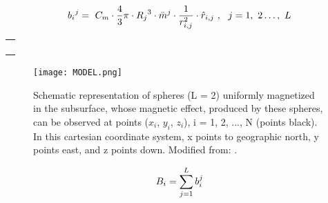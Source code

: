 
\begin{equation} \label{eq:sphere2}
\centering
{b_i}^j=\ C_m \cdot \frac{4}{3}\pi \cdot {R_j}^3 \cdot {\bar{m}}^j\cdot\frac{1}{r_{i,j}^2}\cdot{\hat{r}}_{i,j}\ ,\ \ j=1,\ 2\ldots,\ L
\end{equation}

\begin{tabular}{ l }
\noindent{Where: $C_m=\ \frac{\mu_0}{4\pi}=\ {10}^{-7}\frac{\ H}{m}$; $R_j$ is the radius of the j-th sphere; $r_{i,j}$ is the distance}   \\ 
\noindent{(unit vector ${\hat{r}}_{i,j}$) between the center of the j-th sphere and the observation point i,}    \\  
\noindent{i = 1, 2, . .. N; and ${\bar{m}}^j=\left[{mx}_j\ {my}_j\ {mz}_j\right]^T$ is the vector formed by the cartesian} \\
\noindent{components of the magnetization of the j-th sphere (unit vector ${\hat{m}}^j)$.}
\end{tabular}

\bigskip

\begin{figure}[htbp]
\centering
\texttt{[image: MODEL.png]}
\caption{Schematic representation of spheres (L = 2) uniformly magnetized in the subsurface, whose magnetic effect, produced by these spheres, can be observed at points ($x_i$, $ y_i$, $z_i$), i = 1, 2, ..., N (points black). In this cartesian coordinate system, x points to geographic north, y points east, and z points down. Modified from: \cite{OliveiraJr.2015}.}
\label{fig:MODEL}
\end{figure}


\begin{equation} \label{eq:sphere3}
\centering
B_i=\sum_{j=1}^{L}b_i^j
\end{equation}


